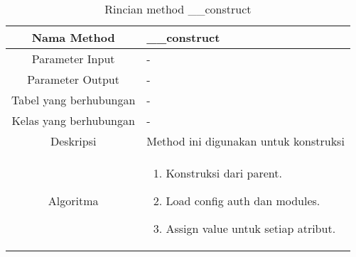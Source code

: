 \begin{center}
	\begin{table}[H]
	\caption{Rincian method \_\_construct}
	\label{table:pengumuman-line-model-construct}
\begin{tabular}{|c|p{11cm}|}
\hline
Nama Method 	& 	 	\_\_construct \\
\hline
Parameter Input & - \\
\hline
Parameter Output & - \\
\hline
Tabel yang berhubungan & -\\
\hline
Kelas yang berhubungan &  - \\
\hline
Deskripsi	& Method ini digunakan untuk konstruksi\\
\hline
Algoritma	& \begin{enumerate}
				\item Konstruksi dari parent.
				\item Load config auth dan modules.
				\item Assign value untuk setiap atribut.
				\end{enumerate} \\
\hline
\end{tabular}
\end{table}
\end{center}

